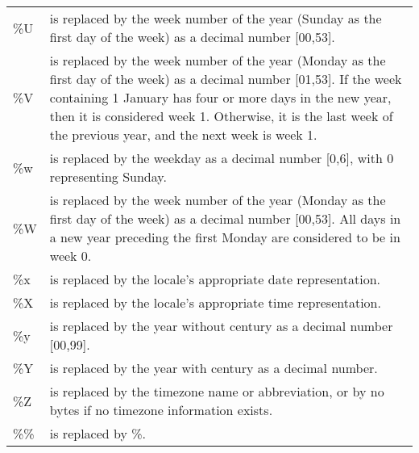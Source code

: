 \begin{center}
\begin{tabularx}{\linewidth}{lX}
\%U & is replaced by the week number of the year (Sunday as the first day of the week) as a decimal number [00,53]. \\
\%V & is replaced by the week number of the year (Monday as the first day of the week) as a decimal number [01,53]. If the week containing 1 January has four or more days in the new year, then it is considered week 1. Otherwise, it is the last week of the previous year, and the next week is week 1. \\
\%w & is replaced by the weekday as a decimal number [0,6], with 0 representing Sunday. \\
\%W & is replaced by the week number of the year (Monday as the first day of the week) as a decimal number [00,53]. All days in a new year preceding the first Monday are considered to be in week 0. \\
\%x & is replaced by the locale's appropriate date representation. \\
\%X & is replaced by the locale's appropriate time representation. \\
\%y & is replaced by the year without century as a decimal number [00,99]. \\
\%Y & is replaced by the year with century as a decimal number. \\
\%Z & is replaced by the timezone name or abbreviation, or by no bytes if no timezone information exists. \\
\%\% & is replaced by \%. \\
\end{tabularx}
\end{center}